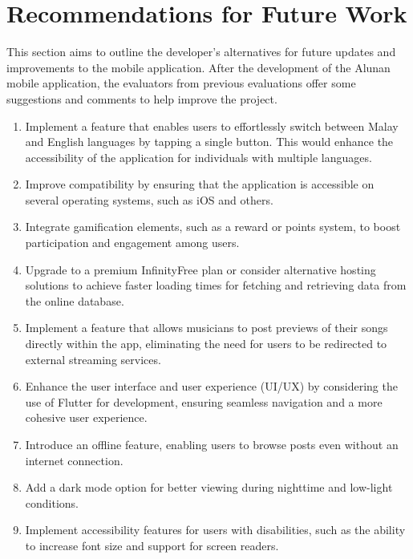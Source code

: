 \section{Recommendations for Future Work}
This section aims to outline the developer's alternatives for future updates and improvements to the mobile application. After the development of the Alunan mobile application, the evaluators from previous evaluations offer some suggestions and comments to help improve the project.
\begin{enumerate}[1.]
    \item Implement a feature that enables users to effortlessly switch between Malay and English languages by tapping a single button. This would enhance the accessibility of the application for individuals with multiple languages.
    \item Improve compatibility by ensuring that the application is accessible on several operating systems, such as iOS and others.
    \item Integrate gamification elements, such as a reward or points system, to boost participation and engagement among users.
    \item Upgrade to a premium InfinityFree plan or consider alternative hosting solutions to achieve faster loading times for fetching and retrieving data from the online database.
    \item Implement a feature that allows musicians to post previews of their songs directly within the app, eliminating the need for users to be redirected to external streaming services.
    \item Enhance the user interface and user experience (UI/UX) by considering the use of Flutter for development, ensuring seamless navigation and a more cohesive user experience.
    \item Introduce an offline feature, enabling users to browse posts even without an internet connection.
    \item Add a dark mode option for better viewing during nighttime and low-light conditions.
    \item Implement accessibility features for users with disabilities, such as the ability to increase font size and support for screen readers.
\end{enumerate}